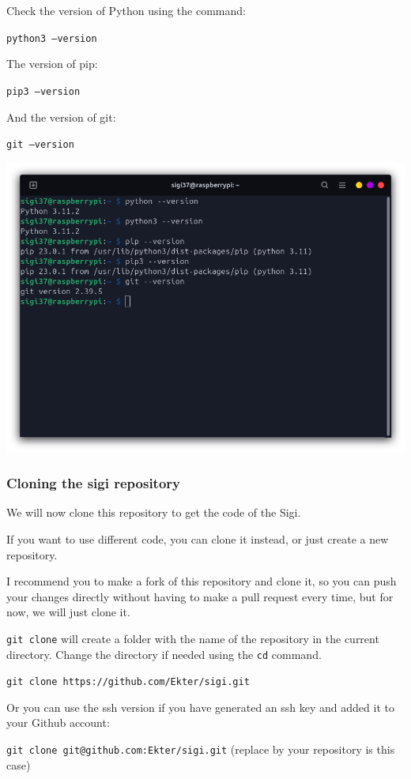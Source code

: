 \documentclass{article}
\begin{document}
Check the version of Python using the command:

\texttt{python3 --version}

The version of pip:

\texttt{pip3 --version}

And the version of git:

\texttt{git --version}

\includegraphics[scale=0.37]{img/all_versions.png}

\subsubsection{Cloning the sigi repository}

We will now clone this repository to get the code of the Sigi.

If you want to use different code, you can clone it instead, or just create a new repository.

I recommend you to make a fork of this repository and clone it, so you can push your changes
directly without having to make a pull request every time, but for now, we will just clone it.

\texttt{git clone} will create a folder with the name of the repository in the current directory.
Change the directory if needed using the \texttt{cd} command.

\texttt{git clone https://github.com/Ekter/sigi.git}

Or you can use the ssh version if you have generated an ssh key and added it to your Github
account:

\texttt{git clone git@github.com:Ekter/sigi.git}
(replace by your repository is this case)
\end{document}
